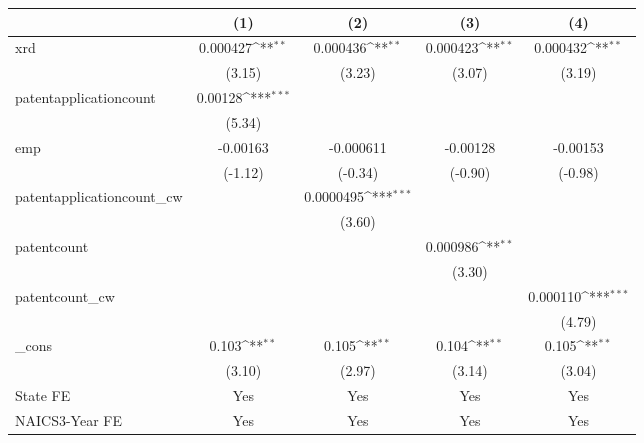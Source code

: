 {
\def\sym#1{\ifmmode^{#1}\else\(^{#1}\)\fi}
\begin{tabular}{l*{4}{c}}
\hline\hline
            &\multicolumn{1}{c}{(1)}         &\multicolumn{1}{c}{(2)}         &\multicolumn{1}{c}{(3)}         &\multicolumn{1}{c}{(4)}         \\
\hline
xrd         &    0.000427\sym{**} &    0.000436\sym{**} &    0.000423\sym{**} &    0.000432\sym{**} \\
            &      (3.15)         &      (3.23)         &      (3.07)         &      (3.19)         \\
[1em]
patentapplicationcount&     0.00128\sym{***}&                     &                     &                     \\
            &      (5.34)         &                     &                     &                     \\
[1em]
emp         &    -0.00163         &   -0.000611         &    -0.00128         &    -0.00153         \\
            &     (-1.12)         &     (-0.34)         &     (-0.90)         &     (-0.98)         \\
[1em]
patentapplicationcount\_cw&                     &   0.0000495\sym{***}&                     &                     \\
            &                     &      (3.60)         &                     &                     \\
[1em]
patentcount &                     &                     &    0.000986\sym{**} &                     \\
            &                     &                     &      (3.30)         &                     \\
[1em]
patentcount\_cw&                     &                     &                     &    0.000110\sym{***}\\
            &                     &                     &                     &      (4.79)         \\
[1em]
\_cons      &       0.103\sym{**} &       0.105\sym{**} &       0.104\sym{**} &       0.105\sym{**} \\
            &      (3.10)         &      (2.97)         &      (3.14)         &      (3.04)         \\
[1em]
State FE    &         Yes         &         Yes         &         Yes         &         Yes         \\
[1em]
NAICS3-Year FE&         Yes         &         Yes         &         Yes         &         Yes         \\

\end{tabular}}
